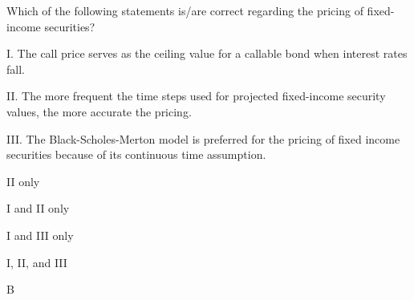 \documentclass{article}
\newcounter{question} %
\begin{document}
\begin{question}
    Which of the following statements is/are correct regarding the pricing of fixed-income securities? 
    
    I. The call price serves as the ceiling value for a callable bond when interest rates fall.
    
    II. The more frequent the time steps used for projected fixed-income security values, the more accurate the pricing.
    
    III. The Black-Scholes-Merton model is preferred for the pricing of fixed income securities because of its continuous time assumption.
\end{question}

\begin{choices}
    \item II only
    \item I and II only
    \item I and III only
    \item I, II, and III
\end{choices}

\begin{correctanswer}
    B
\end{correctanswer}
\end{document}
